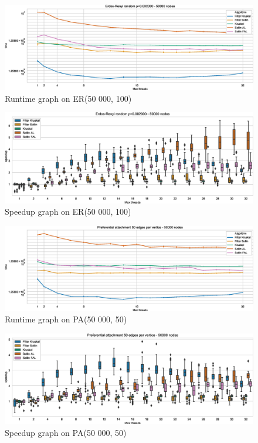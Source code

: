 \documentclass[letterpaper]{article}
\begin{document}
\begin{figure}\centering
  \includegraphics[width=\linewidth]{graphics/Graph_runtime_Erdos-Renyi_random_p=0.002000_50000.eps}
  \caption{Runtime graph on ER(50 000, 100)\label{sparseERruntime}}
\end{figure}

\begin{figure}\centering
  \includegraphics[width=\linewidth]{graphics/Box_Speedup_Erdos-Renyi_random_p=0.002000_50000.eps}
  \caption{Speedup graph on ER(50 000, 100)\label{sparseERspeedup}}
\end{figure}

\begin{figure}\centering
  \includegraphics[width=\linewidth]{graphics/Graph_runtime_Preferential_attachment_50_edges_per_vertice_50000.eps}
  \caption{Runtime graph on PA(50 000, 50)\label{sparsePAruntime}}
\end{figure}

\begin{figure}\centering
  \includegraphics[width=\linewidth]{graphics/Box_Speedup_Preferential_attachment_50_edges_per_vertice_50000.eps}
  \caption{Speedup graph on PA(50 000, 50)\label{sparsePAspeedup}}
\end{figure}
\end{document}
